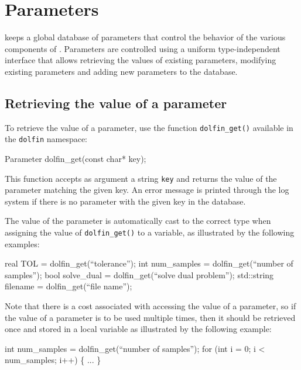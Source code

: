 \chapter{Parameters}

\dolfin{} keeps a global database of parameters that control the
behavior of the various components of \dolfin{}. Parameters are
controlled using a uniform type-independent interface that allows
retrieving the values of existing parameters, modifying existing
parameters and adding new parameters to the database.

\section{Retrieving the value of a parameter}

To retrieve the value of a parameter, use the function \texttt{dolfin\_get()}
available in the \texttt{dolfin} namespace:
\begin{code}
  Parameter dolfin_get(const char* key);
\end{code}
This function accepts as argument a string \texttt{key} and returns
the value of the parameter matching the given key. An error message is
printed through the log system if there is no parameter with the given
key in the database.

The value of the parameter is automatically cast to the correct type
when assigning the value of \texttt{dolfin\_get()} to a variable, as
illustrated by the following examples:
\begin{code}
  real TOL = dolfin_get(``tolerance'');
  int num_samples = dolfin_get(``number of samples'');
  bool solve_dual = dolfin_get(``solve dual problem'');
  std::string filename = dolfin_get(``file name'');
\end{code}

Note that there is a cost associated with accessing the value of a
parameter, so if the value of a parameter is to be used multiple
times, then it should be retrieved once and stored in a local variable
as illustrated by the following example:
\begin{code}
  int num_samples = dolfin_get(``number of samples'');
  for (int i = 0; i < num_samples; i++)
  \{
    ...
  \}
\end{code}

